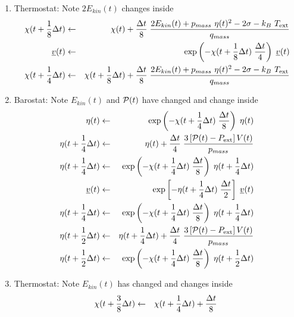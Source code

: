\begin{enumerate}
\item Thermostat: Note $2 E_{kin}(t)$ changes inside
\begin{eqnarray}
\chi (t + {1 \over 8} \Delta t) &\leftarrow& \chi (t) + {\Delta t \over 8} \;
{{2 E_{kin}(t) + p_{mass}~\eta (t)^{2} - 2 \sigma - k_{B}~T_{\rm ext}} \over q_{mass}} \nonumber \\
\mbox{$\underline{v}$}(t) &\leftarrow& \exp \left( -\chi (t + {1 \over 8} \Delta t) \;
{\Delta t \over 4} \right) \; \mbox{$\underline{v}$}(t) \\
\chi (t + {1 \over 4} \Delta t) &\leftarrow& \chi (t + {1 \over 8} \Delta t) + {\Delta t \over 8} \;
{{2 E_{kin}(t) + p_{mass}~\eta (t)^{2} - 2 \sigma - k_{B}~T_{\rm ext}} \over q_{mass}} \nonumber
\end{eqnarray}
\item Barostat: Note $E_{kin}(t)$ and ${\cal P}(t)$ have changed and change inside
\begin{eqnarray}
\eta (t) &\leftarrow& \exp \left( -\chi (t + {1 \over 4} \Delta t) \; {\Delta t \over 8} \right) \;
\eta (t) \nonumber \\
\eta (t + {1 \over 4} \Delta t) &\leftarrow& \eta (t) + {\Delta t \over 4} \;
{3 \left[ {\cal P}(t) - P_{\rm ext} \right] V(t) \over p_{mass}} \nonumber \\
\eta (t + {1 \over 4} \Delta t) &\leftarrow& \exp \left( -\chi (t + {1 \over 4} \Delta t) \;
{\Delta t \over 8} \right)  \; \eta (t + {1 \over 4} \Delta t) \nonumber \\
\mbox{$\underline{v}$}(t) &\leftarrow& \exp \left[ -\eta (t + {1 \over 4} \Delta t) \;
{\Delta t \over 2} \right] \; \mbox{$\underline{v}$}(t) \\
\eta (t + {1 \over 4} \Delta t) &\leftarrow& \exp \left( -\chi (t + {1 \over 4} \Delta t) \;
{\Delta t \over 8} \right)  \; \eta (t + {1 \over 4} \Delta t) \nonumber \\
\eta (t + {1 \over 2} \Delta t) &\leftarrow& \eta (t + {1 \over 4} \Delta t) + {\Delta t \over 4} \;
{3 \left[ {\cal P}(t) - P_{\rm ext} \right] V(t) \over p_{mass}} \nonumber \\
\eta (t + {1 \over 2} \Delta t) &\leftarrow& \exp \left( -\chi (t + {1 \over 4} \Delta t) \;
{\Delta t \over 8} \right)  \; \eta (t + {1 \over 2} \Delta t) \nonumber
\end{eqnarray}
\item Thermostat: Note $E_{kin}(t)$ has changed and changes inside
\begin{eqnarray}
\chi (t + {3 \over 8} \Delta t) &\leftarrow& \chi (t + {1 \over 4} \Delta t) + {\Delta t \over 8} \;

\end{eqnarray}
\end{enumerate}
